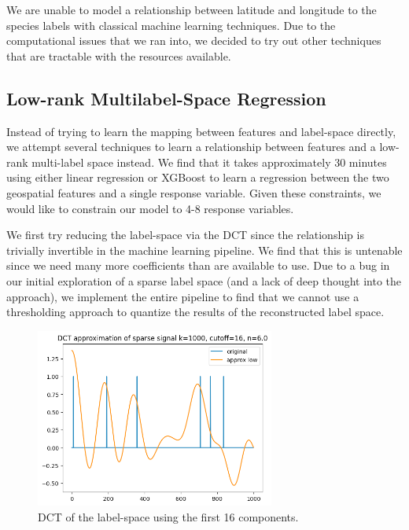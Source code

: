 We are unable to model a relationship between latitude and longitude to the species labels with classical machine learning techniques. 
Due to the computational issues that we ran into, we decided to try out other techniques that are tractable with the resources available. 

\subsection{Low-rank Multilabel-Space Regression}

Instead of trying to learn the mapping between features and label-space directly, we attempt several techniques to learn a relationship between features and a low-rank multi-label space instead. 
We find that it takes approximately 30 minutes using either linear regression or XGBoost to learn a regression between the two geospatial features and a single response variable. 
Given these constraints, we would like to constrain our model to 4-8 response variables. 

We first try reducing the label-space via the DCT since the relationship is trivially invertible in the machine learning pipeline. 
We find that this is untenable since we need many more coefficients than are available to use. 
Due to a bug in our initial exploration of a sparse label space (and a lack of deep thought into the approach), we implement the entire pipeline to find that we cannot use a thresholding approach to quantize the results of the reconstructed label space.

\begin{figure}
    \centering
    \includegraphics[width=0.7\textwidth]{figures/label-dct-sparse.png}
    \caption{DCT of the label-space using the first 16 components.}
    \label{fig:label-dct-sparse}
\end{figure}

